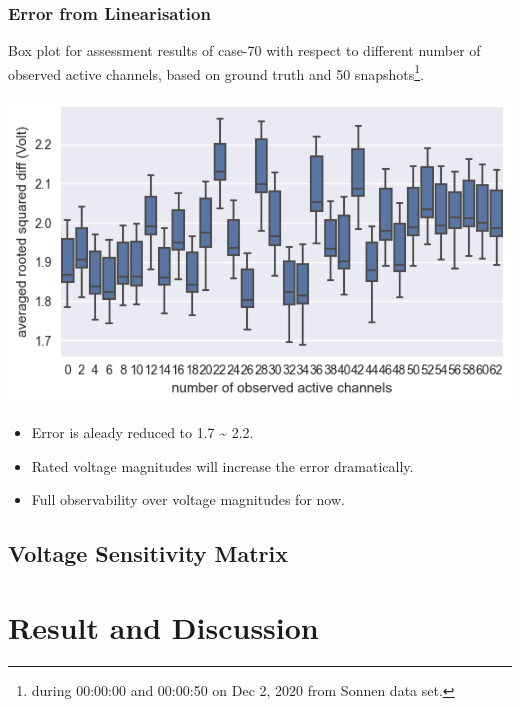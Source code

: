 \documentclass[
]{book}
\providecommand{\tightlist}{%
  \setlength{\itemsep}{0pt}\setlength{\parskip}{0pt}}
\begin{document}
\hypertarget{error-from-linearisation}{%
\subsection*{Error from Linearisation}\label{error-from-linearisation}}

Box plot for assessment results of case-70 with respect to different number of
observed active channels, based on ground truth and 50 snapshots\footnote{during
  00:00:00 and 00:00:50 on Dec 2, 2020 from Sonnen data set.}.

\begin{center}\includegraphics{Pictures/figErrorObsBRM} \end{center}

\begin{itemize}
\tightlist
\item
  Error is aleady reduced to 1.7 \textasciitilde{} 2.2.
\item
  Rated voltage magnitudes will increase the error dramatically.
\item
  Full observability over voltage magnitudes for now.
\end{itemize}

\hypertarget{VSM}{%
\section{Voltage Sensitivity Matrix}\label{VSM}}

\hypertarget{result-and-discussion}{%
\chapter{Result and Discussion}\label{result-and-discussion}}
\end{document}
